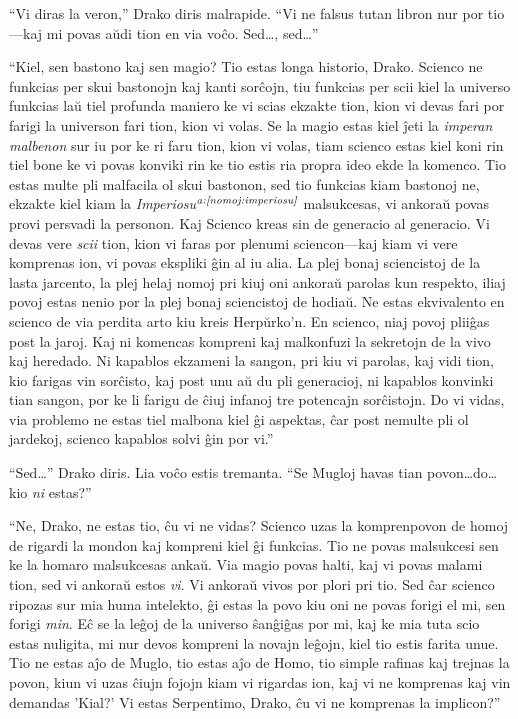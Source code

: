 ``Vi diras la veron,'' Drako diris malrapide. ``Vi ne falsus
tutan libron nur por tio—kaj mi povas aŭdi tion en via
voĉo. Sed\ldots, sed\ldots''

``Kiel, sen bastono kaj sen magio? Tio estas longa historio,
Drako. Scienco ne funkcias per skui bastonojn kaj kanti sorĉojn, tiu
funkcias per scii kiel la universo funkcias laŭ tiel profunda maniero
ke vi scias ekzakte tion, kion vi devas fari por farigi la universon
fari tion, kion vi volas. Se la magio estas kiel ĵeti la \emph{imperan
  malbenon} sur iu por ke ri faru tion, kion vi volas, tiam scienco
estas kiel koni rin tiel bone ke vi povas konviki rin ke tio estis ria
propra ideo ekde la komenco. Tio estas multe pli malfacila ol skui
bastonon, sed tio funkcias kiam bastonoj ne, ekzakte kiel kiam la
\emph{Imperiosu$^{\textit{a:\ref{nomoj:imperiosu}}}$} malsukcesas, vi ankoraŭ povas
provi persvadi la personon. Kaj Scienco kreas sin de generacio al
generacio. Vi devas vere \emph{scii} tion, kion vi faras por plenumi
sciencon—kaj kiam vi vere komprenas ion, vi povas ekspliki ĝin al iu
alia. La plej bonaj sciencistoj de la lasta jarcento, la plej helaj
nomoj pri kiuj oni ankoraŭ parolas kun respekto, iliaj povoj estas
nenio por la plej bonaj sciencistoj de hodiaŭ. Ne estas ekvivalento en
scienco de via perdita arto kiu kreis Herpŭrko'n. En scienco, niaj
povoj pliiĝas post la jaroj. Kaj ni komencas kompreni kaj malkonfuzi
la sekretojn de la vivo kaj heredado. Ni kapablos ekzameni la sangon,
pri kiu vi parolas, kaj vidi tion, kio farigas vin sorĉisto, kaj post
unu aŭ du pli generacioj, ni kapablos konvinki tian sangon, por ke li
farigu de ĉiuj infanoj tre potencajn sorĉistojn. Do vi vidas, via
problemo ne estas tiel malbona kiel ĝi aspektas, ĉar post nemulte pli
ol jardekoj, scienco kapablos solvi ĝin por vi.''

``Sed\ldots'' Drako diris. Lia voĉo estis tremanta. ``Se Mugloj havas
tian povon\ldots do\ldots kio \emph{ni} estas?''

``Ne, Drako, ne estas tio, ĉu vi ne vidas? Scienco uzas la
komprenpovon de homoj de rigardi la mondon kaj kompreni kiel ĝi
funkcias. Tio ne povas malsukcesi sen ke la homaro malsukcesas
ankaŭ. Via magio povas halti, kaj vi povas malami tion, sed vi ankoraŭ
estos \emph{vi}. Vi ankoraŭ vivos por plori pri tio. Sed ĉar scienco
ripozas sur mia huma intelekto, ĝi estas la povo kiu oni ne povas
forigi el mi, sen forigi \emph{min}. Eĉ se la leĝoj de la universo
ŝanĝiĝas por mi, kaj ke mia tuta scio estas nuligita, mi nur devos
kompreni la novajn leĝojn, kiel tio estis farita unue. Tio ne estas
aĵo de Muglo, tio estas aĵo de Homo, tio simple rafinas kaj trejnas la
povon, kiun vi uzas ĉiujn fojojn kiam vi rigardas ion, kaj vi ne
komprenas kaj vin demandas 'Kial?' Vi estas Serpentimo, Drako, ĉu vi ne
komprenas la implicon?''

